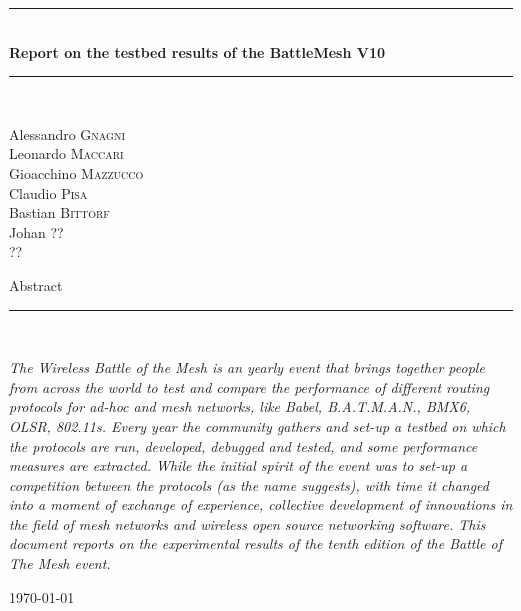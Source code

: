\documentclass[10pt,onecolumn]{paper}
\newcommand{\HRule}{\rule{\linewidth}{0.5mm}}
\begin{document}
\begin{titlepage}
\begin{center}

\HRule \\[0.4cm]
{ \huge \bfseries Report on the testbed results of the BattleMesh V10 \\[0.4cm] }

\HRule \\[1.5cm]

\begin{minipage}{0.4\textwidth}
\begin{flushleft} \large
Alessandro \textsc{Gnagni}\\
Leonardo \textsc{Maccari}\\
Gioacchino \textsc{Mazzucco}\\
Claudio \textsc{Pisa}\\
Bastian \textsc{Bittorf}\\
Johan \textsc{??}\\
 \textsc{??}\\
\end{flushleft}
\end{minipage}
\begin{minipage}{0.4\textwidth}
\end{minipage}

\vfill
{\large Abstract}
\HRule \\[0.4cm]
\begin{flushleft}
\emph{The Wireless Battle of the Mesh is an yearly event that brings together
people from across the world to test and compare the performance of different routing
protocols for ad-hoc and mesh networks, like Babel, B.A.T.M.A.N., BMX6, OLSR,
802.11s. Every year the community gathers and set-up a testbed on which the
protocols are run, developed, debugged and tested, and some performance
measures are extracted. While the initial spirit of the event was to set-up a
competition between the protocols (as the name suggests), with time it changed
into a moment of exchange of experience, collective development of
innovations in the field of mesh networks and wireless open source
networking software. This document reports on the experimental results of the tenth edition
of the Battle of The Mesh event.}
\end{flushleft}
\vskip2cm

\vfill

{\large \today}

\end{center}
\end{titlepage}
\end{document}
